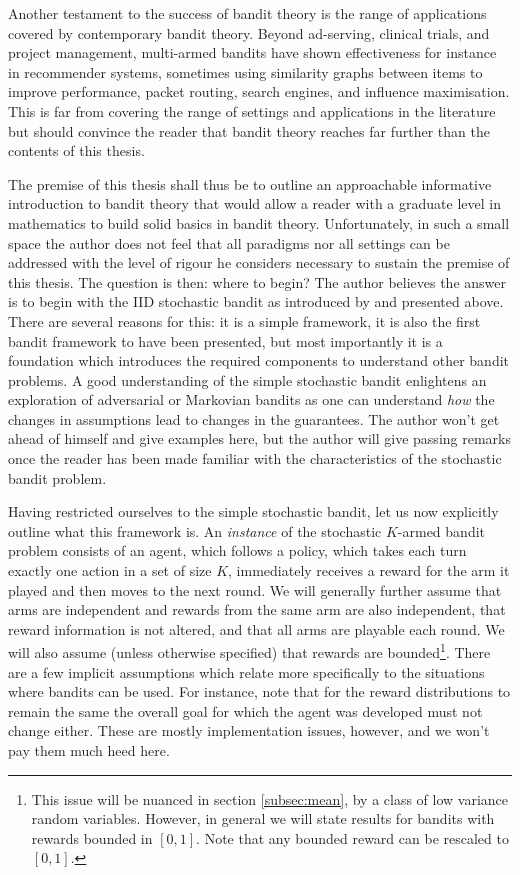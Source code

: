 \par Another testament to the success of bandit theory is the range of applications covered by contemporary bandit theory. Beyond ad-serving, clinical trials, and project management, multi-armed bandits have shown effectiveness for instance in recommender systems, sometimes using similarity graphs between items to improve performance\cite{valko:2014}, packet routing\cite{awerbuch:2004}, search engines\cite{yue:2009}, and influence maximisation\cite{vaswani:2015}. This is far from covering the range of settings and applications in the literature but should convince the reader that bandit theory reaches far further than the contents of this thesis.

\par The premise of this thesis shall thus be to outline an approachable informative introduction to bandit theory that would allow a reader with a graduate level in mathematics to build solid basics in bandit theory. Unfortunately, in such a small space the author does not feel that all paradigms nor all settings can be addressed with the level of rigour he considers necessary to sustain the premise of this thesis. The question is then: where to begin? The author believes the answer is to begin with the IID stochastic bandit as introduced by \cite{robbins:1952} and presented above. There are several reasons for this: it is a simple framework, it is also the first bandit framework to have been presented, but most importantly it is a foundation which introduces the required components to understand other bandit problems. A good understanding of the simple stochastic bandit enlightens an exploration of adversarial or Markovian bandits as one can understand {\em how} the changes in assumptions lead to changes in the guarantees. The author won't get ahead of himself and give examples here, but the author will give passing remarks once the reader has been made familiar with the characteristics of the stochastic bandit problem.  

\par Having restricted ourselves to the simple stochastic bandit, let us now explicitly outline what this framework is. An {\em instance} of the stochastic $K$-armed bandit problem consists of an agent, which follows a policy, which takes each turn exactly one action in a set of size $K$, immediately receives a reward for the arm it played and then moves to the next round. We will generally further assume that arms are independent and rewards from the same arm are also independent, that reward information is not altered, and that all arms are playable each round. We will also assume (unless otherwise specified) that rewards are bounded\footnote{This issue will be nuanced in section \ref{subsec:mean}, by a class of low variance random variables. However, in general we will state results for bandits with rewards bounded in $[0,1]$. Note that any bounded reward can be rescaled to $[0,1]$.}. There are a few implicit assumptions which relate more specifically to the situations where bandits can be used. For instance, note that for the reward distributions to remain the same the overall goal for which the agent was developed must not change either. These are mostly implementation issues, however, and we won't pay them much heed here. 

